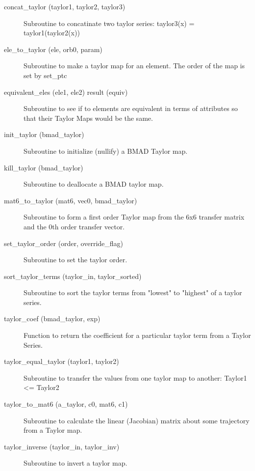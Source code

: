 \begin{description}

\item[concat\_taylor (taylor1, taylor2, taylor3)] \Newline
Subroutine to concatinate two taylor series: taylor3(x) = taylor1(taylor2(x)) 

\item[ele\_to\_taylor (ele, orb0, param)] \Newline
Subroutine to make a taylor map for an element. The order of the map is set by set\_ptc 

\item[equivalent\_eles (ele1, ele2) result (equiv)] \Newline 
     Subroutine to see if to elements are equivalent in terms of attributes so
     that their Taylor Maps would be the same. 

\item[init\_taylor (bmad\_taylor)] \Newline
Subroutine to initialize (nullify) a BMAD Taylor map. 

\item[kill\_taylor (bmad\_taylor)] \Newline
Subroutine to deallocate a BMAD taylor map. 

\item[mat6\_to\_taylor (mat6, vec0, bmad\_taylor)] \Newline
Subroutine to form a first order Taylor map from the 6x6 transfer matrix and the 0th order transfer vector. 

\item[set\_taylor\_order (order, override\_flag)] \Newline
Subroutine to set the taylor order. 

\item[sort\_taylor\_terms (taylor\_in, taylor\_sorted)] \Newline
Subroutine to sort the taylor terms from "lowest" to "highest" of a taylor series. 

\item[taylor\_coef (bmad\_taylor, exp)] \Newline 
Function to return the coefficient for a particular taylor term from a Taylor Series.

\item[taylor\_equal\_taylor (taylor1, taylor2)] \Newline
Subroutine to transfer the values from one taylor map to another: Taylor1 <= Taylor2 

\item[taylor\_to\_mat6 (a\_taylor, c0, mat6, c1)] \Newline
Subroutine to calculate the linear (Jacobian) matrix about some trajectory from a Taylor map. 

\item[taylor\_inverse (taylor\_in, taylor\_inv)] \Newline
Subroutine to invert a taylor map. 


\end{description}
